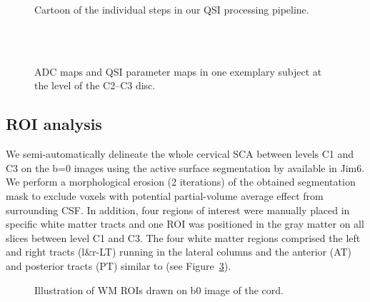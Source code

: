\begin{figure}
  \caption{Cartoon of the individual steps in our QSI processing pipeline.}
  \label{fig:chapter5 exp1 processing pipeline}
\end{figure}


\begin{figure}
\centering
{}
\\
\\
\caption{ADC maps and QSI parameter maps in one exemplary subject at the level of the C2--C3 disc.}
\label{fig:chapter5 exemplary maps}
\end{figure}

\subsection{ROI analysis} We semi-automatically delineate the whole cervical {\gls{SCA}} between levels C1 and C3 on the b=0 images using the active surface segmentation by \citet{Horsfield:2010} available in Jim6. We perform a morphological erosion (2 iterations) of the obtained segmentation mask to exclude voxels with potential partial-volume average effect from surrounding \gls{CSF}. In addition, four regions of interest were manually placed in specific white matter tracts and one ROI was positioned in the gray matter on all slices between level C1 and C3. The four white matter regions comprised the left and right tracts (l\&r-LT) running in the lateral columns and the anterior (AT) and posterior tracts (PT) similar to \citet{Hesseltine:2006,Freund:2010} (see Figure~\ref{fig:chapter5 exp1 ROIs}).

  \begin{figure}
      \centering
      \caption{Illustration of WM ROIs drawn on b0 image of the cord.}
      \label{fig:chapter5 exp1 ROIs}
  \end{figure}

